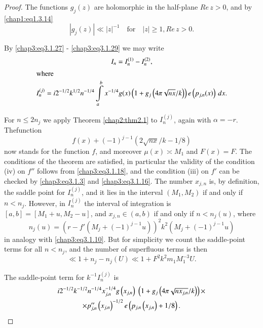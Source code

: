 \begin{proof}
The functions $g_j(z)$ are holomorphic in the half-plane $Re\,z>0$,
and by \eqref{chap1:eq1.3.14}
\begin{equation}\label{chap3:eq3.1.30}
\left|g_j(z)\right|\ll |z|^{-1}\quad\text{for}\quad |z|\geq 1,
Re\,z>0. 
\end{equation}

By \eqref{chap3:eq3.1.27} - \eqref{chap3:eq3.1.29} we may write 
\begin{gather}
I_n=I_n^{(1)}-I_n^{(2)},\label{chap3:eq3.1.31}\\
\intertext{where}
I_n^{(j)}=i2^{-1/2}k^{1/2}n^{-1/4}\int\limits_a^bx^{-1/4}g(x)
\left(1+g_j\left(4\pi\sqrt{nx}/k\right)\right)e\left(p_{j,n}(x)
\right)\,dx.\label{chap3:eq3.1.32}
\end{gather}

For $n\leq 2n_j$ we apply Theorem \ref{chap2:thm2.1} to $I_n^{(j)}$,
again with $\alpha = -r$. The\pageoriginale function 
$$
f(x)+(-1)^{j-1}\left(2\sqrt{nx}/k-1/8\right)
$$
now stands for the function $f$, and moreover $\mu(x)\asymp M_1$ and
$F(x)=F$. The conditions of the theorem are satisfied, in particular
the validity of the condition (iv) on $f''$ follows from
\eqref{chap3:eq3.1.18}, and the condition (iii) on $f'$ can be checked
by \eqref{chap3:eq3.1.3} and \eqref{chap3:eq3.1.16}. The number
$x_{j,n}$ is, by definition, the saddle point for $I_n^{(j)}$, and it
lies in the interval $(M_1,M_2)$ if and only if $n<n_j$. However, in
$I_n^{(j)}$ the interval of integration is $[a,b]=[M_1+u,M_2-u]$, and
$x_{j,n}\in (a,b)$ if and only if $n<n_j(u)$, where
\begin{equation}\label{chap3:eq3.1.33}
n_j(u)=\left(r-f'\left(M_j+(-1)^{j-1}u\right)\right)^2k^2\left(M_j+
(-1)^{j-1}u\right)
\end{equation}
in analogy with \eqref{chap3:eq3.1.10}. But for simplicity we count the
saddle-point terms for all $n<n_j$, and the number of superfluous
terms is then 
\begin{equation}\label{chap3:eq3.1.34}
\ll 1+n_j-n_j(U)\ll 1+F^2k^2m_1M_1^{-3}U.
\end{equation}

The saddle-point term for $k^{-1}I_n^{(j)}$ is 
\begin{gather}
i2^{-1/2}k^{-1/2}n^{-1/4}x_{j,n}^{-1/4}g\left(x_{j,n}\right)\;\left(1+g_j
\left(4\pi\sqrt{nx_{j,n}}/k\right)\right)
\times\label{chap3:eq3.1.35}\\
\times p''_{j,n}\left(x_{j,n}\right)^{-1/2} e\left(p_{j,n}\left
(x_{j,n}\right)+1/8\right).\notag
\end{gather}


\end{proof}
